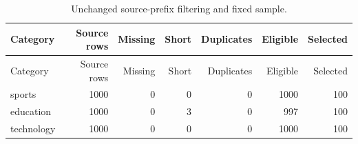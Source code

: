 {\small\renewcommand{\arraystretch}{1.05}
\begin{longtable}{lrrrrrr}
\caption{Unchanged source-prefix filtering and fixed sample.}\\
\toprule
Category & Source rows & Missing & Short & Duplicates & Eligible & Selected \\ \midrule\endfirsthead
\toprule
Category & Source rows & Missing & Short & Duplicates & Eligible & Selected \\ \midrule\endhead
sports & 1000 & 0 & 0 & 0 & 1000 & 100 \\
education & 1000 & 0 & 3 & 0 & 997 & 100 \\
technology & 1000 & 0 & 0 & 0 & 1000 & 100 \\
\bottomrule
\end{longtable}
}
